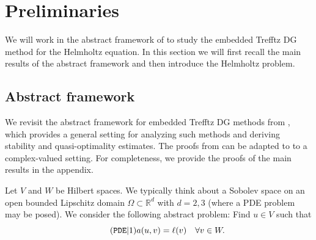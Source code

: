 \documentclass[11pt]{article}
\theoremstyle{definition}
\theoremstyle{plain}
\newcommand{\IR}{\mathbb{R}}
\begin{document}
\section{Preliminaries}\label{sec:prelim}
We will work in the abstract framework of \cite{LLSV_ARXIV_2024} to study the embedded Trefftz DG method for the Helmholtz equation. In this section we will first recall the main results of the abstract framework and then introduce the Helmholtz problem. 
\subsection{Abstract framework}

We revisit the abstract framework for embedded Trefftz DG methods from \cite{LLSV_ARXIV_2024}, which provides a general setting for analyzing such methods and deriving stability and quasi-optimality estimates. The proofs from \cite{LLSV_ARXIV_2024} can be adapted to to a complex-valued setting. For completeness, we provide the proofs of the main results in the appendix.

Let $V$ and $W$ be Hilbert spaces. We typically think about a Sobolev space on an open bounded Lipschitz domain $\Omega\subset \IR^d$ with $d=2,3$ (where a PDE problem may be posed). 
We consider the following abstract problem: Find $u\in V$ such that
\begin{equation}\label{eq:abstract} 
    \addtocounter{equation}{1} \tag{$\texttt{PDE}|\theequation$}
    a(u,v) = \ell(v) \quad \forall v\in W.
\end{equation}
\end{document}
